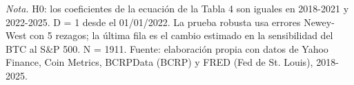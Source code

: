 \begin{table}[H]
\centering
\footnotesize
\caption{Tabla 9. Pruebas de cambio estructural en enero de 2022}
\label{tab:tabla9_chow}
\par\vspace{3pt}\parbox{\textwidth}{\scriptsize \textit{Nota.} H0: los coeficientes de la ecuación de la Tabla 4 son iguales en 2018-2021 y 2022-2025. D = 1 desde el 01/01/2022. La prueba robusta usa errores Newey-West con 5 rezagos; la última fila es el cambio estimado en la sensibilidad del BTC al S\&P 500. N = 1911. Fuente: elaboración propia con datos de Yahoo Finance, Coin Metrics, BCRPData (BCRP) y FRED (Fed de St. Louis), 2018-2025.}
\end{table}